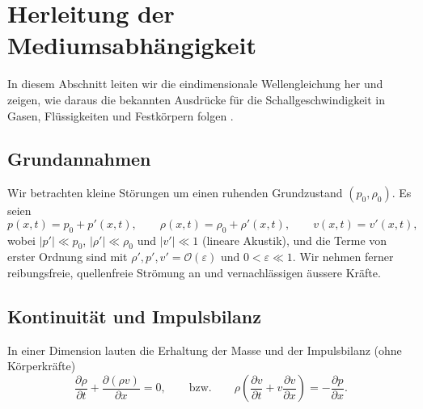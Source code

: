 %
%
%
%
\section{Herleitung der Mediumsabhängigkeit
\label{schall:section:teil1}}

In diesem Abschnitt leiten wir die eindimensionale Wellengleichung her
und zeigen, wie daraus die bekannten Ausdrücke für die Schallgeschwindigkeit
in Gasen, Flüssigkeiten und Festkörpern folgen
\cite{schall:kinsler,schall:landaulifschitz}.

\subsection{Grundannahmen}
Wir betrachten kleine Störungen um einen ruhenden Grundzustand $(p_0,\rho_0)$.
Es seien
\[
    p(x,t)=p_0+p'(x,t),\qquad \rho(x,t)=\rho_0+\rho'(x,t),\qquad v(x,t)=v'(x,t),
\]
wobei $|p'|\ll p_0$, $|\rho'|\ll \rho_0$ und $|v'|\ll 1$ (lineare Akustik),
und die Terme von erster Ordnung sind mit
$\rho',p',v' = \mathcal{O}(\varepsilon) \text{ und } 0<\varepsilon\ll 1$.
Wir nehmen ferner reibungsfreie, quellenfreie Strömung an und
vernachlässigen äussere Kräfte.


\subsection{Kontinuität und Impulsbilanz}
In einer Dimension lauten die Erhaltung der Masse und der Impulsbilanz
(ohne Körperkräfte)
\begin{equation}
\frac{\partial \rho}{\partial t}+\frac{\partial(\rho v)}{\partial x}=0,
\qquad\text{bzw.}\qquad
\rho\left(\frac{\partial v}{\partial t}+v\frac{\partial v}{\partial x}\right)=-\frac{\partial p}{\partial x}.
\label{eq:exact-cont-mom}
\end{equation}

